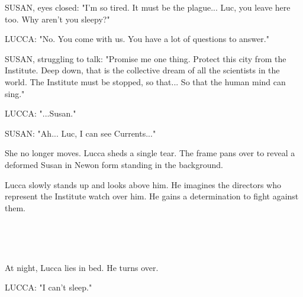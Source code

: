 \documentclass[11pt]{article}
\begin{document}
SUSAN, eyes closed: "I'm so tired.
It must be the plague...
Luc, you leave here too.
Why aren't you sleepy?"

LUCCA: "No. You come with us. 
You have a lot of questions to answer."

SUSAN, struggling to talk: "Promise me one thing.
Protect this city from the Institute.
Deep down, that is the collective dream of all the scientists in the world.
The Institute must be stopped, so that...
So that the human mind can sing."

LUCCA: "...Susan."

SUSAN: "Ah... Luc, I can see Currents..."

She no longer moves.
Lucca sheds a single tear.
The frame pans over to reveal a deformed Susan in Newon form standing in the background.

Lucca slowly stands up and looks above him.
He imagines the directors who represent the Institute watch over him.
He gains a determination to fight against them. 

\ 

\ 

At night, Lucca lies in bed.
He turns over.

LUCCA: "I can't sleep."
\end{document}
